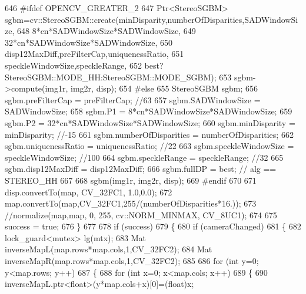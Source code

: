 \begin{DoxyCode}
646 \textcolor{preprocessor}{    #ifdef OPENCV\_GREATER\_2}
647         Ptr<StereoSGBM> sgbm=cv::StereoSGBM::create(minDisparity,numberOfDisparities,SADWindowSize,
648                                                     8*cn*SADWindowSize*SADWindowSize,
649                                                     32*cn*SADWindowSize*SADWindowSize,
650                                                     disp12MaxDiff,preFilterCap,uniquenessRatio,
651                                                     speckleWindowSize,speckleRange,
652                                                     best?StereoSGBM::MODE\_HH:StereoSGBM::MODE\_SGBM);
653         sgbm->compute(img1r, img2r, disp);
654 \textcolor{preprocessor}{    #else}
655         StereoSGBM sgbm;
656         sgbm.preFilterCap =         preFilterCap; \textcolor{comment}{//63}
657         sgbm.SADWindowSize =        SADWindowSize;        
658         sgbm.P1 =                   8*cn*SADWindowSize*SADWindowSize;
659         sgbm.P2 =                   32*cn*SADWindowSize*SADWindowSize;
660         sgbm.minDisparity =         minDisparity; \textcolor{comment}{//-15}
661         sgbm.numberOfDisparities =  numberOfDisparities;
662         sgbm.uniquenessRatio =      uniquenessRatio; \textcolor{comment}{//22}
663         sgbm.speckleWindowSize =    speckleWindowSize; \textcolor{comment}{//100}
664         sgbm.speckleRange =         speckleRange; \textcolor{comment}{//32}
665         sgbm.disp12MaxDiff =        disp12MaxDiff;
666         sgbm.fullDP =               best; \textcolor{comment}{// alg == STEREO\_HH}
667 
668         sgbm(img1r, img2r, disp);
669 \textcolor{preprocessor}{    #endif}
670 
671         disp.convertTo(map, CV\_32FC1, 1.0,0.0);
672         map.convertTo(map,CV\_32FC1,255/(numberOfDisparities*16.));
673         \textcolor{comment}{//normalize(map,map, 0, 255, cv::NORM\_MINMAX, CV\_8UC1);}
674 
675         success = \textcolor{keyword}{true};
676     \}
677 
678     \textcolor{keywordflow}{if} (success)
679     \{
680         \textcolor{keywordflow}{if} (cameraChanged)
681         \{
682             lock\_guard<mutex> lg(mtx);
683             Mat inverseMapL(map.rows*map.cols,1,CV\_32FC2);
684             Mat inverseMapR(map.rows*map.cols,1,CV\_32FC2);
685 
686             \textcolor{keywordflow}{for} (\textcolor{keywordtype}{int} y=0; y<map.rows; y++)
687             \{
688                 \textcolor{keywordflow}{for} (\textcolor{keywordtype}{int} x=0; x<map.cols; x++)
689                 \{
690                     inverseMapL.ptr<\textcolor{keywordtype}{float}>(y*map.cols+x)[0]=(\textcolor{keywordtype}{float})x;

\end{DoxyCode}
